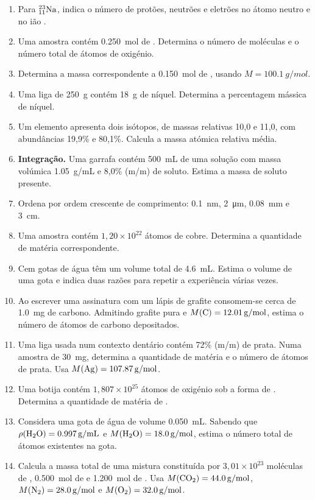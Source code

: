 \documentclass[11pt,a4paper,oneside]{book}
\begin{document}
\begin{exercicios}
\begin{enumerate}
  \item Para $^{23}_{11}\ce{Na}$, indica o número de protões, neutrões e eletrões no átomo neutro e no ião .
  \item Uma amostra contém \SI{0.250}{mol} de . Determina o número de moléculas e o número total de átomos de oxigénio.
  \item Determina a massa correspondente a \SI{0.150}{mol} de , usando $M=\SI{100.1}{g/mol}$.
  \item Uma liga de \SI{250}{g} contém \SI{18}{g} de níquel. Determina a percentagem mássica de níquel.
  \item Um elemento apresenta dois isótopos, de massas relativas 10,0 e 11,0, com abundâncias 19,9\% e 80,1\%. Calcula a massa atómica relativa média.
  \item \textbf{Integração.} Uma garrafa contém \SI{500}{mL} de uma solução com massa volúmica \SI{1.05}{g/mL} e 8,0\% (m/m) de soluto. Estima a massa de soluto presente.
  \item Ordena por ordem crescente de comprimento: \SI{0.1}{nm}, \SI{2}{\micro m}, \SI{0.08}{mm} e \SI{3}{cm}.
  \item Uma amostra contém $1{,}20\times10^{22}$ átomos de cobre. Determina a quantidade de matéria correspondente.
  \item Cem gotas de água têm um volume total de \SI{4.6}{mL}. Estima o volume de uma gota e indica duas razões para repetir a experiência várias vezes.
  \item Ao escrever uma assinatura com um lápis de grafite consomem-se cerca de \SI{1.0}{mg} de carbono. Admitindo grafite pura e $M(\ce C)=\SI{12.01}{g/mol}$, estima o número de átomos de carbono depositados.
  \item Uma liga usada num contexto dentário contém 72\% (m/m) de prata. Numa amostra de \SI{30}{mg}, determina a quantidade de matéria e o número de átomos de prata. Usa $M(\ce{Ag})=\SI{107.87}{g/mol}$.
  \item Uma botija contém $1{,}807\times10^{25}$ átomos de oxigénio sob a forma de . Determina a quantidade de matéria de .
  \item Considera uma gota de água de volume \SI{0.050}{mL}. Sabendo que $\rho(\ce{H2O})=\SI{0.997}{g/mL}$ e $M(\ce{H2O})=\SI{18.0}{g/mol}$, estima o número total de átomos existentes na gota.
  \item Calcula a massa total de uma mistura constituída por $3{,}01\times10^{23}$ moléculas de , \SI{0.500}{mol} de  e \SI{1.200}{mol} de . Usa $M(\ce{CO2})=\SI{44.0}{g/mol}$, $M(\ce{N2})=\SI{28.0}{g/mol}$ e $M(\ce{O2})=\SI{32.0}{g/mol}$.
\end{enumerate}
\end{exercicios}
\end{document}
